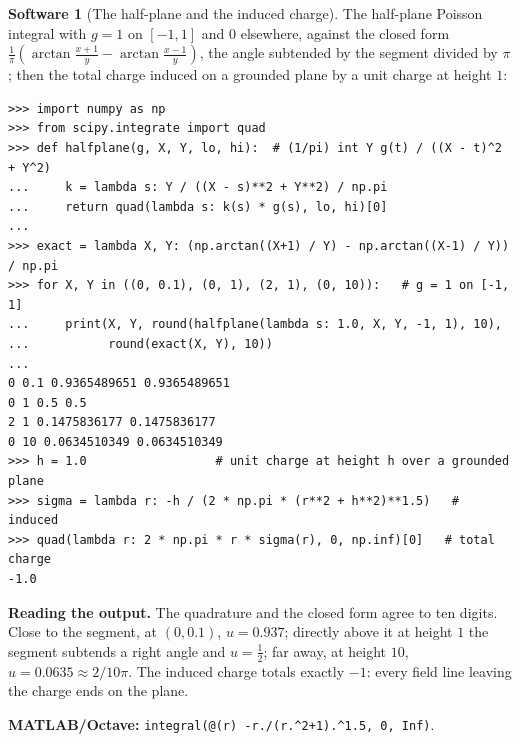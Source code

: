 \documentclass[11pt,a4paper]{article}
\numberwithin{equation}{section}
\theoremstyle{definition}
\newtheorem{software}[thm]{Software}
\begin{document}
\begin{software}[The half-plane and the induced charge]
\label{sw:halfplane}
The half-plane Poisson integral with $g = 1$ on $[-1, 1]$ and $0$ elsewhere, against the closed form $\frac1\pi(\arctan\frac{x + 1}y - \arctan\frac{x - 1}y)$, the angle subtended by the segment divided by $\pi$; then the total charge induced on a grounded plane by a unit charge at height $1$:
{\small\begin{verbatim}
>>> import numpy as np
>>> from scipy.integrate import quad
>>> def halfplane(g, X, Y, lo, hi):  # (1/pi) int Y g(t) / ((X - t)^2 + Y^2)
...     k = lambda s: Y / ((X - s)**2 + Y**2) / np.pi
...     return quad(lambda s: k(s) * g(s), lo, hi)[0]
...
>>> exact = lambda X, Y: (np.arctan((X+1) / Y) - np.arctan((X-1) / Y)) / np.pi
>>> for X, Y in ((0, 0.1), (0, 1), (2, 1), (0, 10)):   # g = 1 on [-1, 1]
...     print(X, Y, round(halfplane(lambda s: 1.0, X, Y, -1, 1), 10),
...           round(exact(X, Y), 10))
...
0 0.1 0.9365489651 0.9365489651
0 1 0.5 0.5
2 1 0.1475836177 0.1475836177
0 10 0.0634510349 0.0634510349
>>> h = 1.0                  # unit charge at height h over a grounded plane
>>> sigma = lambda r: -h / (2 * np.pi * (r**2 + h**2)**1.5)   # induced
>>> quad(lambda r: 2 * np.pi * r * sigma(r), 0, np.inf)[0]   # total charge
-1.0
\end{verbatim}}
\textbf{Reading the output.} The quadrature and the closed form agree to ten digits. Close to the segment, at $(0, 0.1)$, $u = 0.937$; directly above it at height $1$ the segment subtends a right angle and $u = \frac12$; far away, at height $10$, $u = 0.0635 \approx 2/10\pi$. The induced charge totals exactly $-1$: every
field line leaving the charge ends on the plane.

\textbf{MATLAB/Octave:} \texttt{integral(@(r) -r./(r.\^{}2+1).\^{}1.5, 0, Inf)}.
\end{software}
\end{document}
